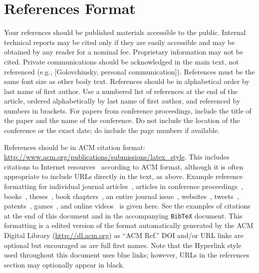 \documentclass{sigchi}
\begin{document}
\section{References Format}
Your references should be published materials accessible to the
public. Internal technical reports may be cited only if they are
easily accessible and may be obtained by any reader for a nominal
fee. Proprietary information may not be cited. Private communications
should be acknowledged in the main text, not referenced (e.g.,
[Golovchinsky, personal communication]). References must be the same
font size as other body text. References should be in alphabetical
order by last name of first author. Use a numbered list of references
at the end of the article, ordered alphabetically by last name of
first author, and referenced by numbers in brackets. For papers from
conference proceedings, include the title of the paper and the name of
the conference. Do not include the location of the conference or the
exact date; do include the page numbers if available. 

References should be in ACM citation format:
\url{http://www.acm.org/publications/submissions/latex_style}.  This
includes citations to Internet
resources~\cite{CHINOSAUR:venue,cavender:writing,psy:gangnam}
according to ACM format, although it is often appropriate to include
URLs directly in the text, as above. Example reference formatting for
individual journal articles~\cite{ethics}, articles in conference
proceedings~\cite{Klemmer:2002:WSC:503376.503378},
books~\cite{Schwartz:1995:GBF}, theses~\cite{sutherland:sketchpad},
book chapters~\cite{winner:politics}, an entire journal
issue~\cite{kaye:puc},
websites~\cite{acm_categories,cavender:writing},
tweets~\cite{CHINOSAUR:venue}, patents~\cite{heilig:sensorama}, 
games~\cite{supermetroid:snes}, and
online videos~\cite{psy:gangnam} is given here.  See the examples of
citations at the end of this document and in the accompanying
\texttt{BibTeX} document. This formatting is a edited version of the
format automatically generated by the ACM Digital Library
(\url{http://dl.acm.org}) as ``ACM Ref.'' DOI and/or URL links are
optional but encouraged as are full first names. Note that the
Hyperlink style used throughout this document uses blue links;
however, URLs in the references section may optionally appear in
black.

\balance{}



\end{document}
